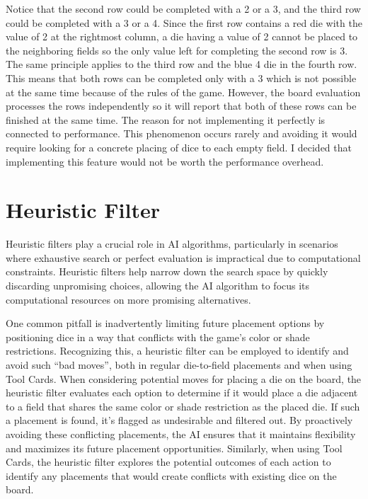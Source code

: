 Notice that the second row could be completed with a 2 or a 3, and the third row could be completed with a 3 or a 4. Since the first row
contains a red die with the value of 2 at the rightmost column, a die having a value of 2 cannot be placed to the neighboring fields so the only 
value left for completing the second row is 3. The same principle applies to the third row and the blue 4 die in the fourth row. This means that 
both rows can be completed only with a 3 which is not possible at the same time because of the rules of the game. However, the board evaluation processes the rows
independently so it will report that both of these rows can be finished at the same time. The reason for not implementing it perfectly is connected
to performance. This phenomenon occurs rarely and avoiding it would require looking for a concrete placing of dice to each empty field. I decided 
that implementing this feature would not be worth the performance overhead.


\section{Heuristic Filter} \label{sec:Heuristic_filter}

Heuristic filters play a crucial role in AI algorithms, particularly in scenarios where exhaustive search or perfect evaluation is impractical due to 
computational constraints. Heuristic filters help narrow down the search space by quickly discarding unpromising choices, allowing the AI algorithm to 
focus its computational resources on more promising alternatives. 

One common pitfall is inadvertently limiting future placement options by positioning dice in a way that conflicts with the game's color or shade restrictions. 
Recognizing this, a heuristic filter can be employed to identify and avoid such ``bad moves'', both in regular die-to-field placements and when using Tool Cards.
When considering potential moves for placing a die on the board, the heuristic filter evaluates each option to determine if it would place a die adjacent to a field 
that shares the same color or shade restriction as the placed die. If such a placement is found, it's flagged as undesirable and filtered out. 
By proactively avoiding these conflicting placements, the AI ensures that it maintains flexibility and maximizes its future placement opportunities.
Similarly, when using Tool Cards, the heuristic filter explores the potential outcomes of each action to identify any placements that would create conflicts with 
existing dice on the board.


